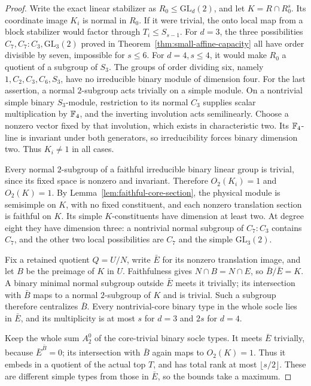 \begin{proof}
Write the exact linear stabilizer as $R_0\leq\mathrm{GL}_d(2)$,
and let $K=R\cap R_0^s$. Its coordinate image $K_i$ is normal
in $R_0$. If it were trivial, the onto local map from a block
stabilizer would factor through $T_i\leq S_{s-1}$.
For $d=3$, the three possibilities $C_7,C_7:C_3,\mathrm{GL}_3(2)$
proved in Theorem~\ref{thm:small-affine-capacity} all have order
divisible by seven, impossible for $s\leq6$.
For $d=4,s\leq4$, it would make $R_0$ a quotient of a subgroup
of $S_3$. The groups of order dividing six, namely
$1,C_2,C_3,C_6,S_3$, have no irreducible binary module of dimension
four. For the last assertion, a normal $2$-subgroup acts trivially
on a simple module. On a nontrivial simple binary $S_3$-module,
restriction to its normal $C_3$ supplies scalar multiplication by
$\mathbb F_4$, and the inverting involution acts semilinearly. Choose
a nonzero vector fixed by that involution, which exists in
characteristic two. Its $\mathbb F_4$-line is invariant under both
generators, so irreducibility forces binary dimension two.
Thus $K_i\ne1$ in all cases.

Every normal $2$-subgroup of a faithful irreducible binary linear
group is trivial, since its fixed space is nonzero and invariant.
Therefore $O_2(K_i)=1$ and $O_2(K)=1$. By
Lemma~\ref{lem:faithful-core-section}, the physical module is
semisimple on $K$, with no fixed constituent, and each nonzero
translation section is faithful on $K$. Its simple $K$-constituents
have dimension at least two. At degree eight they have dimension
three: a nontrivial normal subgroup of $C_7:C_3$ contains $C_7$,
and the other two local possibilities are $C_7$ and the simple
$\mathrm{GL}_3(2)$.

Fix a retained quotient $Q=U/N$, write $\bar E$ for its nonzero
translation image, and let $B$ be the preimage of $K$ in $U$.
Faithfulness gives $N\cap B=N\cap E$, so
$\bar B/\bar E=K$. A binary minimal normal subgroup outside
$\bar E$ meets it trivially; its intersection with $\bar B$ maps
to a normal $2$-subgroup of $K$ and is trivial. Such a subgroup
therefore centralizes $\bar B$. Every nontrivial-core binary type
in the whole socle lies in $\bar E$, and its multiplicity is at
most $s$ for $d=3$ and $2s$ for $d=4$.

Keep the whole sum $A_2^0$ of the core-trivial binary socle types.
It meets $\bar E$ trivially, because $\bar E^{\bar B}=0$;
its intersection with $\bar B$ again maps to $O_2(K)=1$.
Thus it embeds in a quotient of the actual top $T$, and has total
rank at most $\lfloor s/2\rfloor$. These are different simple
types from those in $\bar E$, so the bounds take a maximum.


\end{proof}

